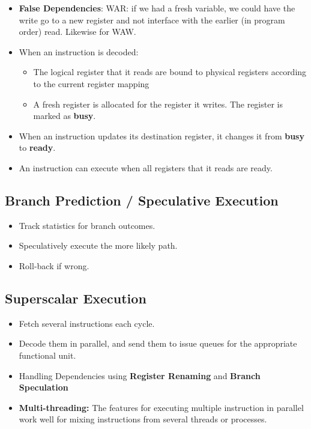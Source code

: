 \documentclass[../main.tex]{subfiles}
\begin{document}
\begin{itemize}
	\item \textbf{False Dependencies}: WAR: if we had a fresh variable, we could have the write go to a new register and not interface with the earlier (in program order) read. Likewise for WAW.
	\item When an instruction is decoded:
	      \begin{itemize}
		      \item The logical register that it reads are bound to physical registers according to the current register mapping
		      \item A fresh register is allocated for the register it writes. The register is marked as \textbf{busy}.
	      \end{itemize}
	\item When an instruction updates its destination register, it changes it from \textbf{busy} to \textbf{ready}.
	\item An instruction can execute when all registers that it reads are ready.
\end{itemize}

\subsection{Branch Prediction / Speculative Execution}

\begin{itemize}
	\item Track statistics for branch outcomes.
	\item Speculatively execute the more likely path.
	\item Roll-back if wrong.
\end{itemize}

\subsection{Superscalar Execution}

\begin{itemize}
	\item Fetch several instructions each cycle.
	\item Decode them in parallel, and send them to issue queues for the appropriate functional unit.
	\item Handling Dependencies using \textbf{Register Renaming} and \textbf{Branch Speculation}
	\item \textbf{Multi-threading:} The features for executing multiple instruction in parallel work well for mixing instructions from several threads or processes.
\end{itemize}
\end{document}
